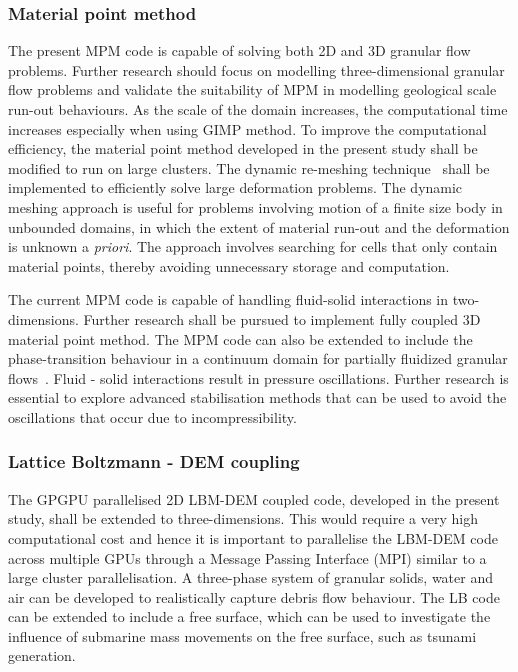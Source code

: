 \subsubsection*{Material point method}

The present MPM code is capable of solving both 2D and 3D granular flow 
problems. Further research should focus on modelling three-dimensional granular 
flow problems and validate the suitability of MPM in modelling geological scale 
run-out behaviours. As the scale of the domain increases, the computational 
time increases especially when using GIMP method. To improve the computational 
efficiency, the material point method developed in the present study shall be 
modified to run on large clusters. The dynamic re-meshing 
technique~\citep{Shin2010a} shall be implemented to efficiently solve 
large deformation problems. The dynamic meshing approach is useful for problems 
involving motion of a finite size body in unbounded domains, in which the 
extent of material run-out and the deformation is unknown a \textit{priori}. 
The approach involves searching for cells that only contain material points, 
thereby avoiding unnecessary storage and computation. 

The current MPM code is capable of handling fluid-solid interactions in 
two-dimensions. Further research shall be pursued to implement fully coupled 3D 
material point method. The MPM code can also be extended to include the 
phase-transition behaviour in a continuum domain for partially fluidized 
granular flows~\citep{Aranson2002, Aranson2001, Volfson2003}. Fluid - solid 
interactions result in pressure oscillations. Further research is essential to 
explore advanced stabilisation methods that can be used to avoid the 
oscillations that occur due to incompressibility.

\subsubsection*{Lattice Boltzmann - DEM coupling}

The GPGPU parallelised 2D LBM-DEM coupled code, developed in the present study, 
shall be extended to 
three-dimensions. This would require a very high computational cost and hence 
it is important to parallelise the LBM-DEM code across multiple GPUs through a 
Message Passing Interface (MPI) similar to a large cluster parallelisation. A 
three-phase system of granular solids, water and air can be developed to 
realistically capture debris flow behaviour. The LB code can be extended to 
include a free surface, which can be used to investigate the influence of 
submarine mass movements on the free surface, such as tsunami generation.

